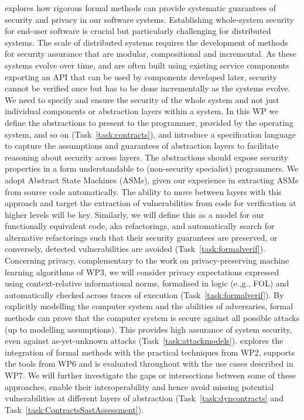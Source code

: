 \begin{Workpackage}{\thewpno}
\begin{WPDescription}
\theWP{} explores how rigorous formal methods can  provide systematic guarantees of security and privacy in our software systems.
Establishing whole-system security for end-user software is crucial but particularly challenging for distributed systems.
The scale of distributed systems requires the development of methods for security assurance that are modular, compositional and 
incremental. As these systems evolve over time, and are often built using existing service components exporting an API that can be used by components developed later,  
security cannot be verified once but has to be done incrementally as the systems evolve.
We need  to specify and ensure the security of the whole system and not just individual components or abstraction layers within a system. 
In this WP we define the abstractions to present to the programmer, provided by the operating system, and so on (Task~\ref{task:contracts}), and introduce a specification language to capture the assumptions and guarantees of abstraction layers to facilitate reasoning about security across  layers.
The abstractions should expose security properties in a form understandable to (non-security specialist) programmers. We adopt Abstract State Machines (ASMs), given our experience in extracting ASMs from source code automatically. 
The ability to move between layers with this approach and target the extraction of vulnerabilities from code for verification at higher levels will be key.
Similarly, we will define this as a model for our functionally equivalent code, aka refactorings, and automatically search for alternative refactorings such that their security guarantees are preserved, or conversely, detected vulnerabilities are avoided (Task~\ref{task:formalverif}).
Concerning privacy, complementary to the work on privacy-preserving machine learning algorithms of WP3, we will consider privacy expectations expressed using context-relative informational norms, formalised in logic (e.,g., FOL) and automatically checked across traces of execution (Task~\ref{task:formalverif}).  
By explicitly modelling the computer system and the abilities of adversaries, formal methods can prove that the computer system is secure against all possible attacks (up to modelling assumptions). This provides high assurance of system security, even against as-yet-unknown attacks (Task~\ref{task:attackmodels}).
\theWP{} explores the integration of formal methods with the practical techniques from WP2, supports the tools from WP6 and is evaluated throughout with the use cases described in WP7.
We will further investigate the gaps or intersections between some of these approaches, enable their interoperability and hence avoid missing potential vulnerabilities at different layers of abstraction (Task~\ref{task:dyncontracts} and Task~\ref{task:ContractsSastAssessment}). 




\end{WPDescription}
\end{Workpackage}

